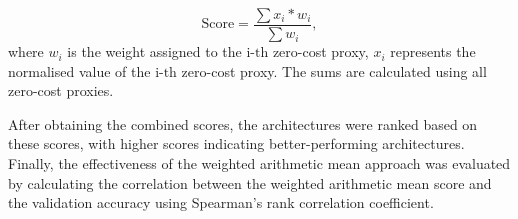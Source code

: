 \begin{equation} 
    \text{Score} = \frac{\sum x_i * w_i }{\sum w_i}, 
    \label{eq:wam}
\end{equation} 
where $w_i$ is the weight assigned to the $\text{i-th}$ zero-cost proxy, $x_i$ represents the normalised value of the $\text{i-th}$ zero-cost proxy. The sums are calculated using all zero-cost proxies.

After obtaining the combined scores, the architectures were ranked based on these scores, with higher scores indicating better-performing architectures. Finally, the effectiveness of the weighted arithmetic mean approach was evaluated by calculating the correlation between the weighted arithmetic mean score and the validation accuracy using Spearman's rank correlation coefficient.